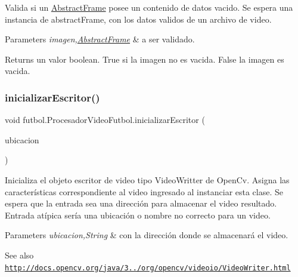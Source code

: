 Valida si un \hyperlink{classfutbol_1_1_abstract_frame}{Abstract\+Frame} posee un contenido de datos vacido. Se espera una instancia de abstract\+Frame, con los datos validos de un archivo de video. 
\begin{DoxyParams}{Parameters}
{\em imagen,\hyperlink{classfutbol_1_1_abstract_frame}{Abstract\+Frame}} & a ser validado. \\
\hline
\end{DoxyParams}
\begin{DoxyReturn}{Returns}
un valor boolean. True si la imagen no es vacida. False la imagen es vacida. 
\end{DoxyReturn}
\hypertarget{classfutbol_1_1_procesador_video_futbol_a95adcf4bac9877ac83e8f8bd92f7fdda}{}\label{classfutbol_1_1_procesador_video_futbol_a95adcf4bac9877ac83e8f8bd92f7fdda} 
\subsubsection{\texorpdfstring{inicializar\+Escritor()}{inicializarEscritor()}}
{\footnotesize\ttfamily void futbol.\+Procesador\+Video\+Futbol.\+inicializar\+Escritor (\begin{DoxyParamCaption}\item[{String}]{ubicacion }\end{DoxyParamCaption})\hspace{0.3cm}{\ttfamily [private]}}

Inicializa el objeto escritor de video tipo Video\+Writter de Open\+Cv. Asigna las características correspondiente al video ingresado al instanciar esta clase. Se espera que la entrada sea una dirección para almacenar el video resultado. Entrada atípica sería una ubicación o nombre no correcto para un video. 
\begin{DoxyParams}{Parameters}
{\em ubicacion,String} & con la dirección donde se almacenará el video. \\
\hline
\end{DoxyParams}
\begin{DoxySeeAlso}{See also}
\href{http://docs.opencv.org/java/3.1.0/org/opencv/videoio/VideoWriter.html}{\tt http\+://docs.\+opencv.\+org/java/3../org/opencv/videoio/\+Video\+Writer.\+html} 
\end{DoxySeeAlso}


